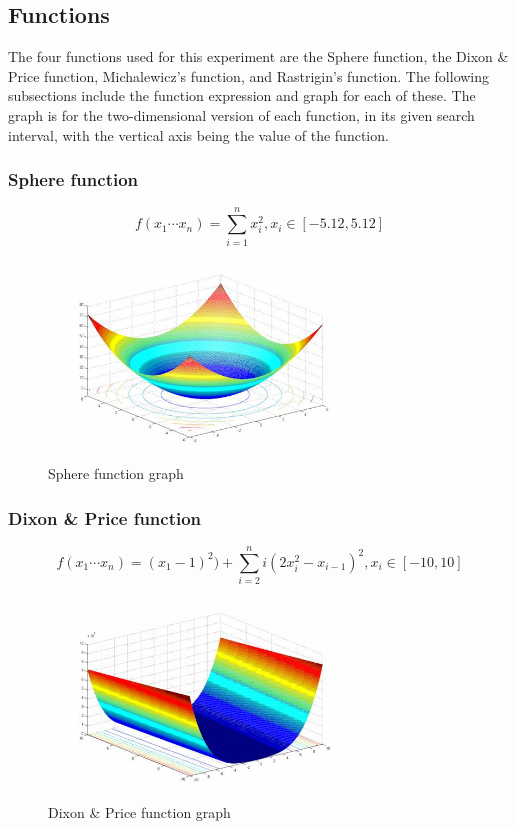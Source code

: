 \documentclass{article}
\begin{document}
	\subsection{Functions}
	The four functions used for this experiment are the Sphere function, the Dixon \& Price function, Michalewicz's function, and Rastrigin's function. The following subsections include the function expression and graph for each of these. The graph is for the two-dimensional version of each function, in its given search interval, with the vertical axis being the value of the function.

	\subsubsection{Sphere function}
	$$f(x_1 \cdots x_n) = {\sum_{i=1}^{n} x_i^{2}}, x_i \in [-5.12, 5.12]$$

	\begin{figure}[!h]
		\includegraphics[height=150pt,keepaspectratio]{images/sphere-graph.jpg}
		\caption{Sphere function graph}
	\end{figure}

    \newpage
	\subsubsection{Dixon \& Price function}
	$$f(x_1 \cdots x_n) = (x_1 - 1)^2 ) + {\sum_{i=2}^{n} i(2x_i^{2} - x_{i-1})^2}, x_i \in [-10, 10]$$


	\begin{figure}[!h]
		\includegraphics[height=150pt,keepaspectratio]{images/dixon-graph.jpg}
		\caption{Dixon \& Price function graph}
	\end{figure}
\end{document}
